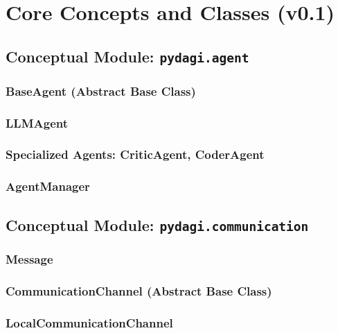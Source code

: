 \documentclass{amsbook}
\theoremstyle{definition}
\theoremstyle{remark}
\numberwithin{equation}{chapter} %
\begin{document}
\chapter{Core Concepts and Classes (v0.1)}
    \section{Conceptual Module: \texttt{pydagi.agent}}
        \subsection{BaseAgent (Abstract Base Class)}
        \subsection{LLMAgent}
        \subsection{Specialized Agents: CriticAgent, CoderAgent}
        \subsection{AgentManager}
    \section{Conceptual Module: \texttt{pydagi.communication}}
        \subsection{Message}
        \subsection{CommunicationChannel (Abstract Base Class)}
        \subsection{LocalCommunicationChannel}
\end{document}
